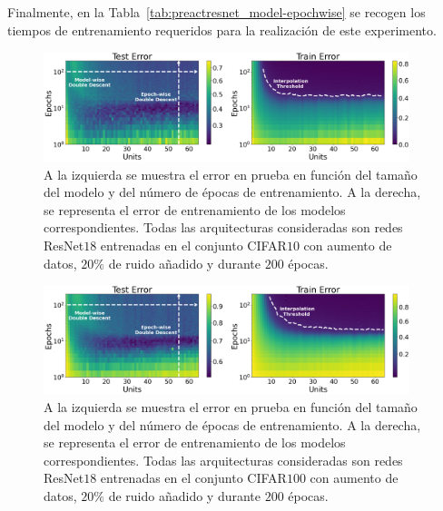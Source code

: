 Finalmente, en la Tabla~\ref{tab:preactresnet_model-epochwise} se recogen los tiempos de entrenamiento requeridos para la realización de este experimento.

\begin{figure}[h]
    \centering
    \includegraphics[width=0.95\textwidth]{img/experiments/model-epochPreActResNet18CIFAR10augmented.png}
    \caption[Doble descenso en función del tamaño del modelo y del número de épocas para la red ResNet$18$ y el conjunto CIFAR$10$.]{A la izquierda se muestra el error en prueba en función del tamaño del modelo y del número de épocas de entrenamiento. A la derecha, se representa el error de entrenamiento de los modelos correspondientes. Todas las arquitecturas consideradas son redes ResNet$18$ entrenadas en el conjunto CIFAR$10$ con aumento de datos\protect\footnotemark, $20\%$ de ruido añadido y durante $200$ épocas.}\label{fig:model-epochPreActResNet18CIFAR10}
\end{figure}

\begin{figure}[h]
    \centering
    \includegraphics[width=0.95\textwidth]{img/experiments/model-epochPreActResNet18CIFAR100augmented.png}
    \caption[Doble descenso en función del tamaño del modelo y del número de épocas para la red ResNet$18$ y el conjunto CIFAR$100$.]{A la izquierda se muestra el error en prueba en función del tamaño del modelo y del número de épocas de entrenamiento. A la derecha, se representa el error de entrenamiento de los modelos correspondientes. Todas las arquitecturas consideradas son redes ResNet$18$ entrenadas en el conjunto CIFAR$100$ con aumento de datos, $20\%$ de ruido añadido y durante $200$ épocas.}\label{fig:model-epochPreActResNet18CIFAR100}
\end{figure}

